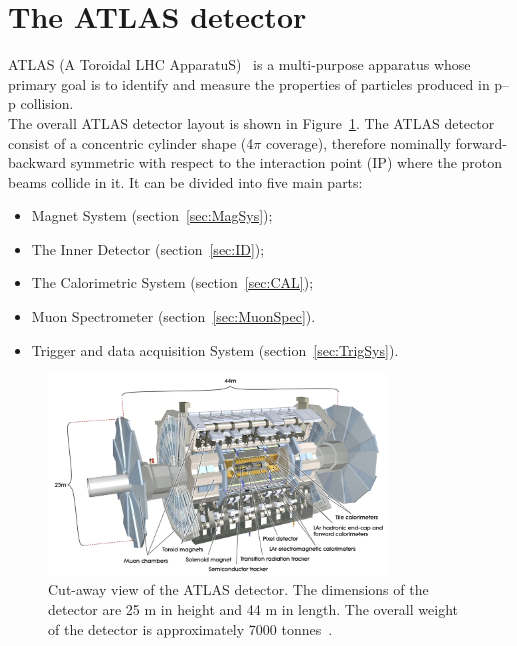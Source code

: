 \section{The ATLAS detector}
ATLAS (A Toroidal LHC ApparatuS)~\cite{ATLAS} is a multi-purpose apparatus whose primary goal is to identify and measure the properties of particles produced in p--p collision.\\
The overall ATLAS detector layout is shown in Figure~\ref{fig:ATLAS}.
The ATLAS detector consist of a concentric cylinder shape (4$\pi$ coverage), therefore nominally forward-backward symmetric with respect to the interaction point (IP) where the proton beams collide in it.
It can be divided into five main parts:
\begin{itemize}
	\item Magnet System (section~\ref{sec:MagSys});
	\item The Inner Detector  (section~\ref{sec:ID});
	\item The Calorimetric System  (section~\ref{sec:CAL});
	\item Muon Spectrometer  (section~\ref{sec:MuonSpec}).
	\item Trigger and data acquisition System  (section~\ref{sec:TrigSys}).
\end{itemize}
\begin{figure}[h]
	\centering
	\includegraphics[width=90mm]{Chapters/CH2/figures/ATLAS}
	\caption{Cut-away view of the ATLAS detector. The dimensions of the detector are 25 m in height and 44 m in length. The overall weight of the detector is approximately 7000 tonnes~\cite{ATLAS}.}
	\label{fig:ATLAS}
\end{figure}
